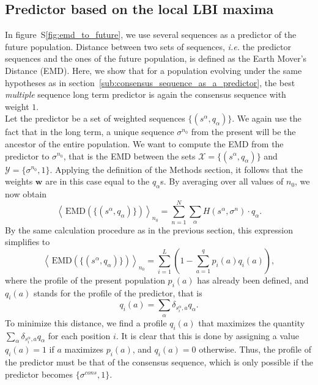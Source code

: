 \documentclass[reprint,amsmath,amssymb,superscriptaddress,showpacs,rmp]{revtex4-1}
\newcommand{\sref}[1]{S\ref{#1}}
\begin{document}

\subsection{Predictor based on the local LBI maxima} %
\label{sub:predictor_based_on_the_local_lbi_maxima}
	In figure~\sref{fig:emd_to_future}, we use several sequences as a predictor of the future population. Distance between two sets of sequences, \emph{i.e.} the predictor sequences and the ones of the future population, is defined as the Earth Mover's Distance (EMD). Here, we show that for a population evolving under the same hypotheses as in section~\ref{sub:consensus_sequence_as_a_predictor}, the best \emph{multiple} sequence long term predictor is again the consensus sequence with weight $1$. \\
	Let the predictor be a set of weighted sequences $\{(s^\alpha, q_\alpha)\}$. We again use the fact that in the long term, a unique sequence $\sigma^{n_0}$ from the present will be the ancestor of the entire population. We want to compute the EMD from the predictor to $\sigma^{n_0}$, that is the EMD between the sets $\mathcal{X}=\{(s^\alpha, q_\alpha)\}$ and $\mathcal{Y} = \{\sigma^{n_0},1\}$. Applying the definition of the Methods section, it follows that the weights $\mathbf{w}$ are in this case equal to the $q_\alpha$s. By averaging over all values of $n_0$, we now obtain
	$$ \left\langle \,\text{EMD}\left(\{(s^\alpha, q_\alpha)\}\right) \right\rangle_{n_0} = \sum_{n=1}^N\sum_{\alpha} H(s^\alpha, \sigma^n)\cdot q_\alpha.$$
	By the same calculation procedure as in the previous section, this expression simplifies to
	$$ \left\langle \,\text{EMD}\left(\{(s^\alpha, q_\alpha)\}\right)\right\rangle_{n_0} = \sum_{i=1}^L\left( 1 - \sum_{a=1}^q p_i(a)q_i(a) \right), $$
	where the profile of the present population $p_i(a)$ has already been defined, and $q_i(a)$ stands for the profile of the predictor, that is
	$$ q_i(a) = \sum_{\alpha} \delta_{s^\alpha_i, a}q_\alpha.$$
	To minimize this distance, we find a profile $q_i(a)$ that maximizes the quantity $\sum_{\alpha} \delta_{s^\alpha_i, a}q_\alpha$ for each position $i$. It is clear that this is done by assigning a value $q_i(a)=1$ if $a$ maximizes $p_i(a)$, and $q_i(a)=0$ otherwise. Thus, the profile of the predictor must be that of the consensus sequence, which is only possible if the predictor becomes $\{\sigma^{cons},1\}$.
\end{document}
